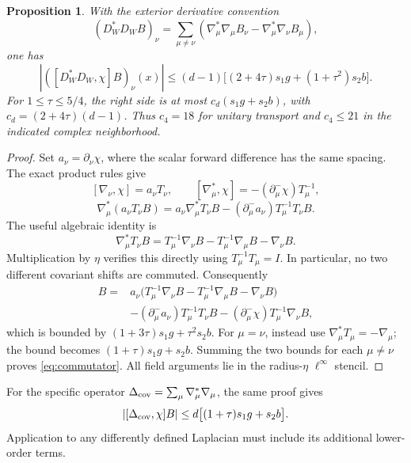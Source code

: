 \documentclass[11pt]{article}
\newtheorem{proposition}[theorem]{Proposition}
\theoremstyle{remark}
\newcommand{\abs}[1]{\left|#1\right|}
\begin{document}
\begin{proposition}\label{prop:commutator}
With the exterior derivative convention
\[
 (D_W^*D_WB)_\nu
 =\sum_{\mu\ne\nu}
 (\nabla_\mu^*\nabla_\mu B_\nu-
  \nabla_\mu^*\nabla_\nu B_\mu),
\]
one has
\begin{equation}\label{eq:commutator}
 \abs{([D_W^*D_W,\chi]B)_\nu(x)}
 \le(d-1)\bigl[(2+4\tau)s_1g+(1+\tau^2)s_2b\bigr].
\end{equation}
For $1\le\tau\le5/4$, the right side is at most
$c_d(s_1g+s_2b)$, with $c_d=(2+4\tau)(d-1)$.
Thus $c_4=18$ for unitary transport and $c_4\le21$ in the indicated
complex neighborhood.
\end{proposition}

\begin{proof}
Set $a_\nu=\partial_\nu\chi$, where the scalar forward difference has
the same spacing. The exact product rules give
\[
 [\nabla_\nu,\chi]=a_\nu T_\nu,
 \qquad [\nabla_\mu^*,\chi]=-(\partial^-_\mu\chi)T_\mu^{-1},
\]
\[
 \nabla_\mu^*(a_\nu T_\nu B)
 =a_\nu\nabla_\mu^*T_\nu B
  -(\partial^-_\mu a_\nu)T_\mu^{-1}T_\nu B.
\]
The useful algebraic identity is
\begin{equation}\label{eq:no-curvature}
 \nabla_\mu^*T_\nu B
 =T_\mu^{-1}\nabla_\nu B
  -T_\mu^{-1}\nabla_\mu B-\nabla_\nu B.
\end{equation}
Multiplication by $\eta$ verifies this directly using
$T_\mu^{-1}T_\mu=I$. In particular, no two different covariant shifts
are commuted. Consequently
\begin{align*}
 [\nabla_\mu^*\nabla_\nu,\chi]B
 ={}&a_\nu\bigl(T_\mu^{-1}\nabla_\nu B
       -T_\mu^{-1}\nabla_\mu B-\nabla_\nu B\bigr)\\
 &-(\partial^-_\mu a_\nu)T_\mu^{-1}T_\nu B
  -(\partial^-_\mu\chi)T_\mu^{-1}\nabla_\nu B,
\end{align*}
which is bounded by $(1+3\tau)s_1g+\tau^2s_2b$.
For $\mu=\nu$, instead use
$\nabla_\mu^*T_\mu=-\nabla_\mu$; the bound becomes
$(1+\tau)s_1g+s_2b$. Summing the two bounds for each
$\mu\ne\nu$ proves \eqref{eq:commutator}.
All field arguments lie in the radius-$\eta$ $\ell^\infty$ stencil.
\end{proof}

For the specific operator $\Delta_{\rm cov}=\sum_\mu
\nabla_\mu^*\nabla_\mu$, the same proof gives
\begin{equation}\label{eq:laplace-comm}
 \abs{[\Delta_{\rm cov},\chi]B}
 \le d\bigl[(1+\tau)s_1g+s_2b\bigr].
\end{equation}
Application to any differently defined Laplacian must include its
additional lower-order terms.
\end{document}
